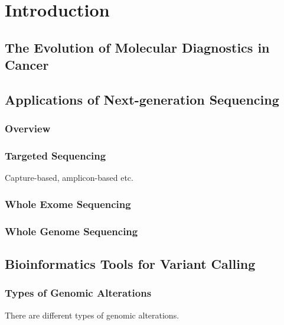 
\chapter{Introduction}
\label{ch:Introduction}

\section{The Evolution of Molecular Diagnostics in Cancer}
\label{sec:The Evolution of Molecular Diagnostics in Cancer}



\section{Applications of Next-generation Sequencing}
\label{sec:ApplicationsofNext-generationSequencing}

\subsection{Overview}

\subsection{Targeted Sequencing}
Capture-based, amplicon-based etc.

\subsection{Whole Exome Sequencing}

\subsection{Whole Genome Sequencing}

\section{Bioinformatics Tools for Variant Calling}
\label{sec:BioinformaticsToolsforVariantCalling}

\subsection{Types of Genomic Alterations}
There are different types of genomic alterations.

